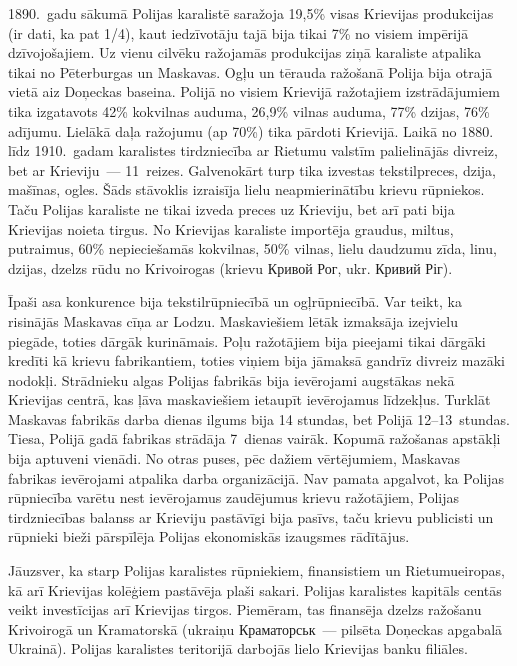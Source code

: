 \documentclass[twoside,a5paper,12pt,fleqn,openany]{extbook}
\newcommand{\rutxti}[1]{\textrussian{#1}}
\newcommand{\uktxti}[1]{\textukrainian{#1}}
\begin{document}
1890.~gadu sākumā Polijas karalistē saražoja 19,5\% visas Krievijas produkcijas (ir dati, ka pat 1/4), kaut iedzīvotāju tajā bija tikai 7\% no visiem impērijā dzīvojošajiem. Uz vienu cilvēku ražojamās produkcijas ziņā karaliste atpalika tikai no Pēterburgas un Maskavas. Ogļu un tērauda ražošanā Polija bija otrajā vietā aiz Doņeckas baseina. Polijā no visiem Krievijā ražotajiem izstrādājumiem tika izgatavots 42\% kokvilnas auduma, 26,9\% vilnas auduma, 77\% dzijas, 76\% adījumu. Lielākā daļa ražojumu (ap 70\%) tika pārdoti Krievijā. Laikā no 1880. līdz 1910.~gadam karalistes tirdzniecība ar Rietumu valstīm palielinājās divreiz, bet ar Krieviju~--- 11~reizes. Galvenokārt turp tika izvestas tekstilpreces, dzija, mašīnas, ogles. Šāds stāvoklis izraisīja lielu neapmierinātību krievu rūpniekos. Taču Polijas karaliste ne tikai izveda preces uz Krieviju, bet arī pati bija Krievijas noieta tirgus. No Krievijas karaliste importēja graudus, miltus, putraimus, 60\% nepieciešamās kokvilnas, 50\% vilnas, lielu daudzumu zīda, linu, dzijas, dzelzs rūdu no Krivoirogas (krievu \rutxti{Кривой Рог}, ukr. \uktxti{Кривий Ріг}).

Īpaši asa konkurence bija tekstilrūpniecībā un ogļrūpniecībā. Var teikt, ka risinājās Maskavas cīņa ar Lodzu. Maskaviešiem lētāk izmaksāja izejvielu piegāde, toties dārgāk kurināmais. Poļu ražotājiem bija pieejami tikai dārgāki kredīti kā krievu fabrikantiem, toties viņiem bija jāmaksā gandrīz divreiz mazāki nodokļi. Strādnieku algas Polijas fabrikās bija ievērojami augstākas nekā Krievijas centrā, kas ļāva maskaviešiem ietaupīt ievērojamus līdzekļus. Turklāt Maskavas fabrikās darba dienas ilgums bija 14 stundas, bet Polijā 12--13~stundas. Tiesa, Polijā gadā fabrikas strādāja 7~dienas vairāk. Kopumā ražošanas apstākļi bija aptuveni vienādi. No otras puses, pēc dažiem vērtējumiem, Maskavas fabrikas ievērojami atpalika darba organizācijā. Nav pamata apgalvot, ka Polijas rūpniecība varētu nest ievērojamus zaudējumus krievu ražotājiem, Polijas tirdzniecības balanss ar Krieviju pastāvīgi bija pasīvs, taču krievu publicisti un rūpnieki bieži pārspīlēja Polijas ekonomiskās izaugsmes rādītājus.

Jāuzsver, ka starp Polijas karalistes rūpniekiem, finansistiem un Rietumueiropas, kā arī Krievijas kolēģiem pastāvēja plaši sakari. Polijas karalistes kapitāls centās veikt investīcijas arī Krievijas tirgos. Piemēram, tas finansēja dzelzs ražošanu Krivoirogā un Kramatorskā (ukraiņu \uktxti{Краматорськ}~--- pilsēta Doņeckas apgabalā Ukrainā). Polijas karalistes teritorijā darbojās lielo Krievijas banku filiāles.
\end{document}
